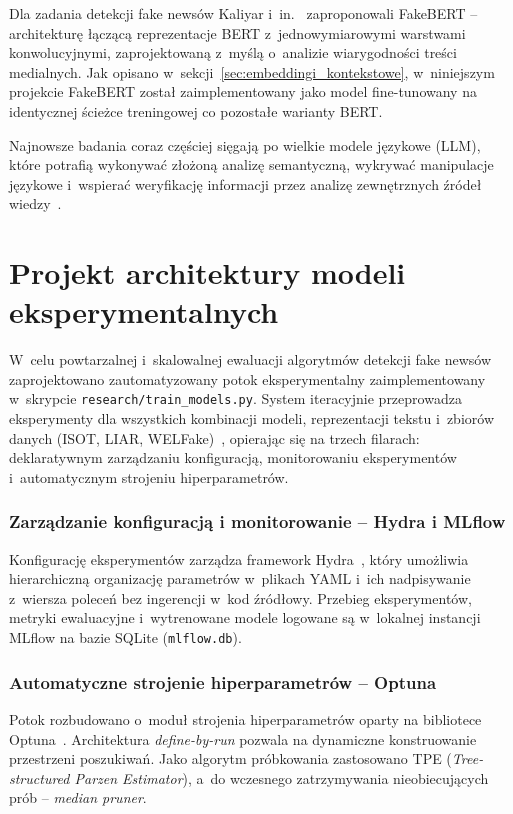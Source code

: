 \documentclass[oneside,polski,logo]{amuthesis}
\begin{document}
Dla zadania detekcji fake newsów Kaliyar i~in.~\cite{Kaliyar2021} zaproponowali FakeBERT -- architekturę łączącą reprezentacje BERT z~jednowymiarowymi warstwami konwolucyjnymi, zaprojektowaną z~myślą o~analizie wiarygodności treści medialnych. Jak opisano w~sekcji~\ref{sec:embeddingi_kontekstowe}, w~niniejszym projekcie FakeBERT został zaimplementowany jako model fine-tunowany na identycznej ścieżce treningowej co pozostałe warianty BERT.

Najnowsze badania coraz częściej sięgają po wielkie modele językowe (LLM), które potrafią wykonywać złożoną analizę semantyczną, wykrywać manipulacje językowe i~wspierać weryfikację informacji przez analizę zewnętrznych źródeł wiedzy~\cite{Li2024, Yi2025}.

\section{Projekt architektury modeli eksperymentalnych}

W~celu powtarzalnej i~skalowalnej ewaluacji algorytmów detekcji fake newsów zaprojektowano zautomatyzowany potok eksperymentalny zaimplementowany w~skrypcie \texttt{research/train\_models.py}. System iteracyjnie przeprowadza eksperymenty dla wszystkich kombinacji modeli, reprezentacji tekstu i~zbiorów danych (ISOT, LIAR, WELFake)~\cite{kaggle_isot, kaggle_liar, kaggle_welfake}, opierając się na trzech filarach: deklaratywnym zarządzaniu konfiguracją, monitorowaniu eksperymentów i~automatycznym strojeniu hiperparametrów.

\subsubsection*{Zarządzanie konfiguracją i monitorowanie -- Hydra i MLflow}

Konfigurację eksperymentów zarządza framework Hydra~\cite{Yadan2019Hydra}, który umożliwia hierarchiczną organizację parametrów w~plikach YAML i~ich nadpisywanie z~wiersza poleceń bez ingerencji w~kod źródłowy. Przebieg eksperymentów, metryki ewaluacyjne i~wytrenowane modele logowane są w~lokalnej instancji MLflow na bazie SQLite (\texttt{mlflow.db}).

\subsubsection*{Automatyczne strojenie hiperparametrów -- Optuna}

Potok rozbudowano o~moduł strojenia hiperparametrów oparty na bibliotece Optuna~\cite{akiba2019optuna}. Architektura \textit{define-by-run} pozwala na dynamiczne konstruowanie przestrzeni poszukiwań. Jako algorytm próbkowania zastosowano TPE (\textit{Tree-structured Parzen Estimator}), a~do wczesnego zatrzymywania nieobiecujących prób -- \textit{median pruner}.
\end{document}
